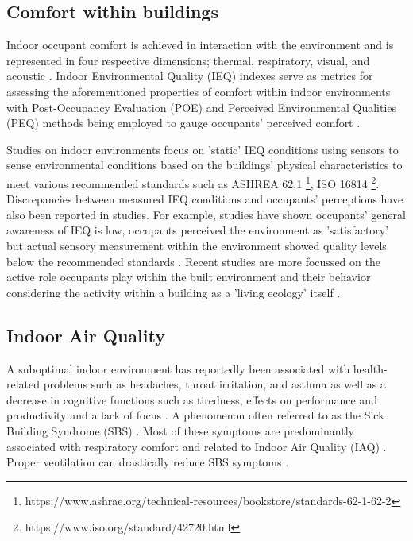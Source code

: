 \subsection{Comfort within buildings}

Indoor occupant comfort is achieved in interaction with the environment and is represented in four respective dimensions; thermal, respiratory, visual, and acoustic \cite{alavi_comfort_2017}. Indoor Environmental Quality (IEQ) \cite{kulshreshtha_indoor_2024} indexes serve as metrics for assessing the aforementioned properties of comfort within indoor environments with Post-Occupancy Evaluation (POE) \cite{elsayed_post-occupancy_2023} and Perceived Environmental Qualities (PEQ) \cite{son_perceived_2023} methods being employed to gauge occupants' perceived comfort \cite{boissonneault_concepts_2023}. 

Studies on indoor environments focus on 'static' IEQ conditions using sensors to sense environmental conditions based on the buildings' physical characteristics to meet various recommended standards such as ASHREA 62.1 \footnote{https://www.ashrae.org/technical-resources/bookstore/standards-62-1-62-2}, ISO 16814 \footnote{https://www.iso.org/standard/42720.html}. Discrepancies between measured IEQ conditions and occupants' perceptions have also been reported in studies. For example, studies have shown occupants' general awareness of IEQ is low, occupants perceived the environment as 'satisfactory' but actual sensory measurement within the environment showed quality levels below the recommended standards \cite{son_perceived_2023}. Recent studies are more focussed on the active role occupants play within the built environment and their behavior considering the activity within a building as a 'living ecology' itself \cite{langevin_quantifying_2016}. 


\subsection{Indoor Air Quality}

A suboptimal indoor environment has reportedly been associated with health-related problems such as headaches, throat irritation, and asthma \cite{klepeis_national_2001} as well as a decrease in cognitive functions such as tiredness, effects on performance and productivity and a lack of focus \cite{wang_how_2021} \cite{du_indoor_2020}. A phenomenon often referred to as the Sick Building Syndrome (SBS) \cite{gawande_indoor_2020, passarelli_sick_2009}. Most of these symptoms are predominantly associated with respiratory comfort and related to Indoor Air Quality (IAQ) \cite{kim_analyzing_2019}. Proper ventilation can drastically reduce SBS symptoms \cite{gawande_indoor_2020}.

